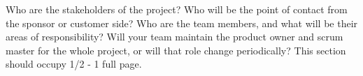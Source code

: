 Who are the stakeholders of the project? Who will be the point of contact from the sponsor or customer side? Who are the team members, and what will be their areas of responsibility? Will your team maintain the product owner and scrum master for the whole project, or will that role change periodically? This section should occupy 1/2 - 1 full page.
